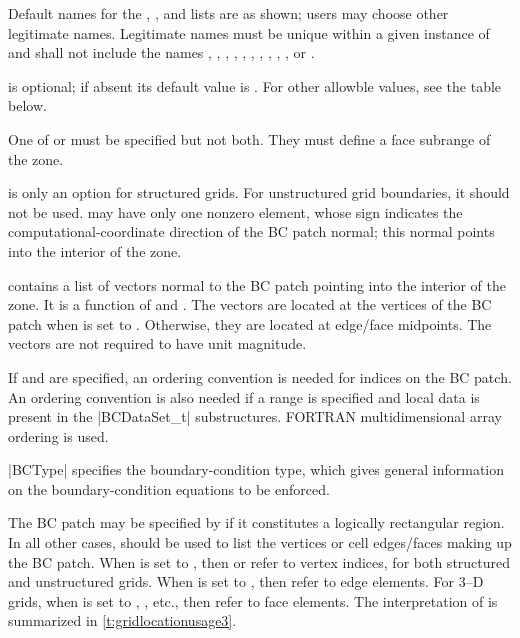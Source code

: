 \clearpage
\begin{notes}
\item Default names for the , , and
      lists are as shown; users may choose other legitimate names.
      Legitimate names must be unique within a given instance
      of  and shall not include the names
      , , ,
      , 
      , , ,
      , , ,
       or .
\item {} is optional; if absent its default value is .
      For other allowble values, see the table below. 
\item One of  or  must be specified but not
     both. They must define a face subrange of the zone.
\item {} is only an option for structured grids.
      For unstructured grid boundaries, it should not be used.
       may have only one nonzero element, whose sign
      indicates the computational-coordinate direction of the BC patch normal;
      this normal points into the interior of the zone.
\item {} contains a list of vectors normal to the BC patch
      pointing into the interior of the zone.
      It is a function of  and .
      The vectors are located at the vertices of the BC patch when
       is set to . Otherwise, they are
      located at edge/face midpoints.
      The vectors are not required to have unit magnitude.
\item If  and  are specified,
      an ordering convention is needed for indices on the BC patch.
      An ordering convention is also needed if a range is specified and
      local data is present in the |BCDataSet_t| substructures.
      FORTRAN multidimensional array ordering is used.
\end{notes}

|BCType| specifies the boundary-condition type, which gives general
information on the boundary-condition equations to be enforced.

The BC patch may be specified by 
if it constitutes a logically rectangular region.
In all other cases,  should be
used to list the vertices or cell edges/faces making up the BC patch.  When
 is set to , then  or
 refer to vertex indices, for both structured and unstructured
grids.  When  is set to , then 
refer to edge elements.  For 3--D grids, when  is set to
, , etc., then  refer
to face elements.  The interpretation of  is summarized
in \autoref{t:gridlocationusage3}.

